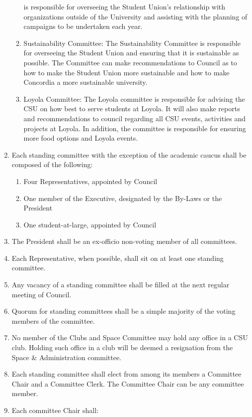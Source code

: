\documentclass[oneside]{book}
\begin{document}
\begin{enumerate}
\begin{enumerate}
is responsible for overseeing the Student Union's relationship with
organizations outside of the University and assisting with the planning
of campaigns to be undertaken each year. 
\item Sustainability Committee: The Sustainability Committee is responsible
for overseeing the Student Union and ensuring that it is sustainable
as possible. The Committee can make recommendations to Council as
to how to make the Student Union more sustainable and how to make
Concordia a more sustainable university. 
\item Loyola Committee: The Loyola committee is responsible for advising
the CSU on how best to serve students at Loyola. It will also make
reports and recommendations to council regarding all CSU events, activities
and projects at Loyola. In addition, the committee is responsible
for ensuring more food options and Loyola events. 
\end{enumerate}
\item Each standing committee with the exception of the academic caucus
shall be composed of the following: 

\begin{enumerate}
\item Four Representatives, appointed by Council 
\item One member of the Executive, designated by the By-Laws or the President 
\item One student-at-large, appointed by Council 
\end{enumerate}
\item The President shall be an ex-officio non-voting member of all committees. 
\item Each Representative, when possible, shall sit on at least one standing
committee. 
\item \label{committee-vacancy} Any vacancy of a standing committee shall be filled at the next regular
meeting of Council. 
\item Quorum for standing committees shall be a simple majority of the voting
members of the committee. 
\item No member of the Clubs and Space Committee may hold any office in
a CSU club. Holding such office in a club will be deemed a resignation
from the Space \& Administration committee. 
\item Each standing committee shall elect from among its members a Committee
Chair and a Committee Clerk. The Committee Chair can be any committee
member. 
\item \label{committee-chair-responsibilities} Each committee Chair shall: 


\end{enumerate}
\end{document}
